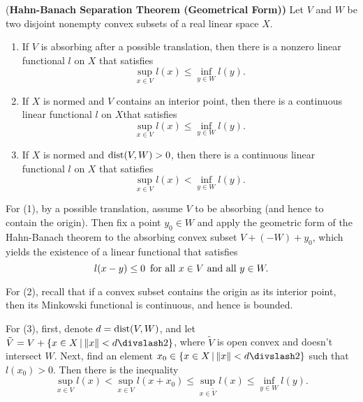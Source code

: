 \begin{theorem}{(\bf Hahn-Banach Separation Theorem (Geometrical Form))}
  Let $V$ and $W$ be two disjoint nonempty convex subsets of a real linear space $X$.
  \begin{enumerate}
    \item If $V$ is absorbing after a possible translation, then there is a nonzero linear functional $l$ on $X$ that satisfies
    \begin{equation*}
        \sup_{x\in V}l(x)\leq\inf_{y\in W}l(y).
      \end{equation*}
    \item If $X$ is normed and $V$ contains an interior point, then there is a continuous linear functional $l$ on $X$that satisfies
    \begin{equation*}
      \sup_{x\in V}l(x)\leq\inf_{y\in W}l(y).
    \end{equation*}
    \item If $X$ is normed and $\operatorname{dist}(V, W)>0$, then there is a continuous linear functional $l$ on $X$ that satisfies
    \begin{equation*}
      \sup_{x\in V}l(x)<\inf_{y\in W}l(y).
    \end{equation*}
  \end{enumerate}
\end{theorem}

\begin{hint}
  For (1), by a possible translation, assume $V$ to be absorbing (and hence to contain the origin). Then fix a point $y_0\in W$ and apply the geometric form of the Hahn-Banach theorem to the absorbing convex subset $V+(-W)+y_0$, which yields the existence of a linear functional that satisfies
  \begin{equation*}
    l(x-y)\leq 0\text{\enskip for all }x\in V\text{ and all }y\in W.
  \end{equation*}

  For (2), recall that if a convex subset contains the origin as its interior point, then its Minkowski functional is continuous, and hence is bounded.

  For (3), first, denote $d=\operatorname{dist}(V, W)$, and let $\tilde V = V + \{x\in X\VERT \NORM x< d\DIV 2\}$, where $\tilde V$ is open convex and doesn't intersect $W$. Next, find an element $x_0\in \{x\in X\VERT \NORM x< d\DIV 2\}$ such that $l(x_0)>0$. Then there is the inequality
  \begin{equation*}
    \sup_{x\in V}l(x)<\sup_{x\in V}l(x+x_0)\leq\sup_{x\in\tilde V}l(x)\leq \inf_{y\in W}l(y).
  \end{equation*}
\end{hint}

